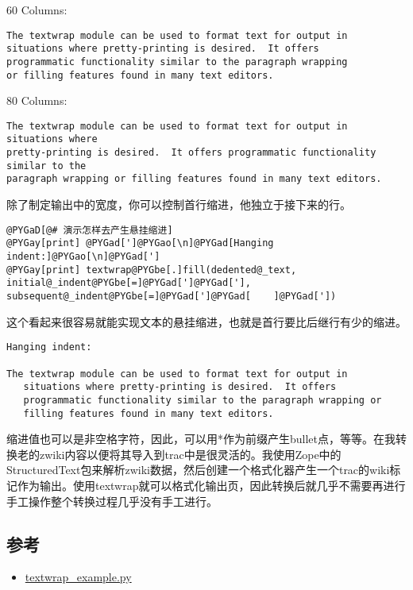 \documentclass[a4paper,10pt,english]{manual}
\begin{document}
60 Columns:

\begin{Verbatim}[commandchars=@\[\]]
The textwrap module can be used to format text for output in
situations where pretty-printing is desired.  It offers
programmatic functionality similar to the paragraph wrapping
or filling features found in many text editors.
\end{Verbatim}

80 Columns:

\begin{Verbatim}[commandchars=@\[\]]
The textwrap module can be used to format text for output in situations where
pretty-printing is desired.  It offers programmatic functionality similar to the
paragraph wrapping or filling features found in many text editors.
\end{Verbatim}

除了制定输出中的宽度，你可以控制首行缩进，他独立于接下来的行。

\begin{Verbatim}[commandchars=@\[\]]
@PYGaD[@# 演示怎样去产生悬挂缩进]
@PYGay[print] @PYGad[']@PYGao[\n]@PYGad[Hanging indent:]@PYGao[\n]@PYGad[']
@PYGay[print] textwrap@PYGbe[.]fill(dedented@_text, initial@_indent@PYGbe[=]@PYGad[']@PYGad['], subsequent@_indent@PYGbe[=]@PYGad[']@PYGad[    ]@PYGad['])
\end{Verbatim}

这个看起来很容易就能实现文本的悬挂缩进，也就是首行要比后继行有少的缩进。

\begin{Verbatim}[commandchars=@\[\]]
Hanging indent:

The textwrap module can be used to format text for output in
   situations where pretty-printing is desired.  It offers
   programmatic functionality similar to the paragraph wrapping or
   filling features found in many text editors.
\end{Verbatim}

缩进值也可以是非空格字符，因此，可以用*作为前缀产生bullet点，等等。在我转换老的zwiki内容以便将其导入到trac中是很灵活的。我使用Zope中的StructuredText包来解析zwiki数据，然后创建一个格式化器产生一个trac的wiki标记作为输出。使用textwrap就可以格式化输出页，因此转换后就几乎不需要再进行手工操作整个转换过程几乎没有手工进行。


\subsection{参考}
\begin{itemize}
\item {} 
\href{http://www.doughellmann.com/PyMOTW/textwrap\_example.py}{textwrap\_example.py}

\end{itemize}
\end{document}
